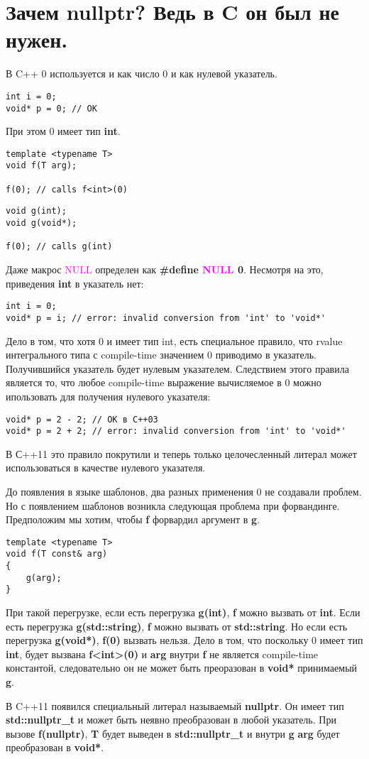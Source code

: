 \section{Зачем nullptr? Ведь в C он был не нужен.}
В C++ 0 используется и как число 0 и как нулевой указатель. 
\begin{verbatim}
int i = 0;
void* p = 0; // OK
\end{verbatim}
При этом 0 имеет тип {\bf int}.
\begin{verbatim}
template <typename T>
void f(T arg);

f(0); // calls f<int>(0)
\end{verbatim}
\begin{verbatim}
void g(int);
void g(void*);

f(0); // calls g(int)
\end{verbatim}

Даже макрос \textcolor{magenta}{NULL} определен как {\bf \#define \textcolor{magenta}{NULL} 0}.
Несмотря на это, приведения {\bf int} в указатель нет:
\begin{verbatim}
int i = 0;
void* p = i; // error: invalid conversion from 'int' to 'void*'
\end{verbatim}
Дело в том, что хотя 0 и имеет тип int, есть специальное правило, что rvalue интегрального типа с compile-time значением 0 приводимо в указатель. Получившийся указатель будет нулевым указателем. Следствием этого правила является то, что любое compile-time выражение вычисляемое в 0 можно ипользовать для получения нулевого указателя:
\begin{verbatim}
void* p = 2 - 2; // OK в C++03
void* p = 2 + 2; // error: invalid conversion from 'int' to 'void*'
\end{verbatim}
В С++11 это правило покрутили и теперь только целочесленный литерал может использоваться в качестве нулевого указателя.

До появления в языке шаблонов, два разных применения 0 не создавали проблем. Но с появлением шаблонов возникла следующая проблема при форвандинге. Предположим мы хотим, чтобы {\bf f} форвардил аргумент в {\bf g}.
\begin{verbatim}
template <typename T>
void f(T const& arg)
{
    g(arg);
}
\end{verbatim}
При такой перегрузке, если есть перегрузка {\bf g(int)}, {\bf f} можно вызвать от {\bf int}. Если есть перегрузка {\bf g(std::string)}, {\bf f} можно вызвать от {\bf std::string}. Но если есть перегрузка {\bf g(void*)}, {\bf f(0)} вызвать нельзя. Дело в том, что поскольку 0 имеет тип {\bf int}, будет вызвана {\bf f<int>(0)} и {\bf arg} внутри {\bf f} не является compile-time константой, следовательно он не может быть преоразован в {\bf void*} принимаемый {\bf g}.

В C++11 появился специальный литерал называемый {\bf nullptr}. Он имеет тип {\bf std::nullptr\_t} и может быть неявно преобразован в любой указатель. При вызове {\bf f(nullptr)}, {\bf T} будет выведен в {\bf std::nullptr\_t} и внутри {\bf g} {\bf arg} будет преобразован в {\bf void*}.
